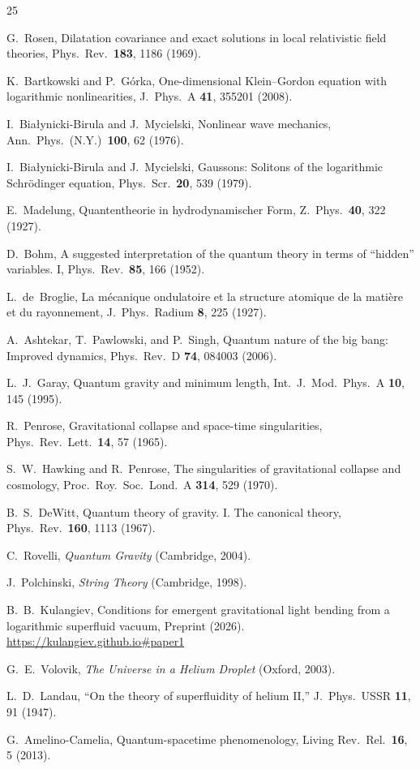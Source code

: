 \documentclass[12pt, a4paper]{article}
\begin{document}
\begin{thebibliography}{25}

G.~Rosen,
Dilatation covariance and exact solutions in local relativistic field theories,
Phys.\ Rev.\ \textbf{183}, 1186 (1969).

K.~Bartkowski and P.~G\'{o}rka,
One-dimensional Klein--Gordon equation with logarithmic nonlinearities,
J.\ Phys.\ A \textbf{41}, 355201 (2008).

I.~Bia{\l}ynicki-Birula and J.~Mycielski,
Nonlinear wave mechanics,
Ann.\ Phys.\ (N.Y.)\ \textbf{100}, 62 (1976).

I.~Bia{\l}ynicki-Birula and J.~Mycielski,
Gaussons: Solitons of the logarithmic Schr\"{o}dinger
equation,
Phys.\ Scr.\ \textbf{20}, 539 (1979).

E.~Madelung,
Quantentheorie in hydrodynamischer Form,
Z.\ Phys.\ \textbf{40}, 322 (1927).

D.~Bohm,
A suggested interpretation of the quantum theory in terms of ``hidden'' variables. I,
Phys.\ Rev.\ \textbf{85}, 166 (1952).

L.~de~Broglie,
La m\'{e}canique ondulatoire et la structure atomique de la mati\`{e}re et du rayonnement,
J.\ Phys.\ Radium \textbf{8}, 225 (1927).

A.~Ashtekar, T.~Pawlowski, and P.~Singh,
Quantum nature of the big bang: Improved dynamics,
Phys.\ Rev.\ D \textbf{74}, 084003 (2006).

L.~J.~Garay,
Quantum gravity and minimum length,
Int.\ J.\ Mod.\ Phys.\ A \textbf{10}, 145 (1995).

R.~Penrose,
Gravitational collapse and space-time singularities,
Phys.\ Rev.\ Lett.\ \textbf{14}, 57 (1965).

S.~W.~Hawking and R.~Penrose,
The singularities of gravitational collapse and cosmology,
Proc.\ Roy.\ Soc.\ Lond.\ A \textbf{314}, 529 (1970).

B.~S.~DeWitt,
Quantum theory of gravity. I. The canonical theory,
Phys.\ Rev.\ \textbf{160}, 1113 (1967).

C.~Rovelli,
\emph{Quantum Gravity} (Cambridge, 2004).

J.~Polchinski,
\emph{String Theory} (Cambridge, 1998).

B.~B.~Kulangiev,
Conditions for emergent gravitational light bending
from a logarithmic superfluid vacuum,
Preprint (2026).
\url{https://kulangiev.github.io#paper1}

G.~E.~Volovik,
\emph{The Universe in a Helium Droplet} (Oxford, 2003).

L.~D.~Landau,
``On the theory of superfluidity of helium II,''
J.\ Phys.\ USSR \textbf{11}, 91 (1947).

G.~Amelino-Camelia,
Quantum-spacetime phenomenology,
Living Rev.\ Rel.\ \textbf{16}, 5 (2013).

\end{thebibliography}
\end{document}
